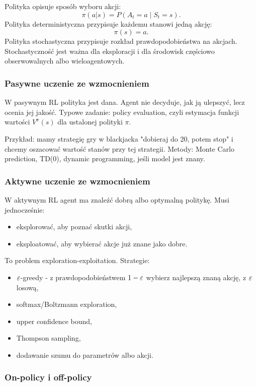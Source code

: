 Polityka opisuje sposób wyboru akcji:
\[
\pi(a|s)=P(A_t=a\mid S_t=s).
\]
Polityka deterministyczna przypisuje każdemu stanowi jedną akcję:
\[
\pi(s)=a.
\]
Polityka stochastyczna przypisuje rozkład prawdopodobieństwa na akcjach. Stochastyczność jest ważna dla eksploracji i dla środowisk częściowo obserwowalnych albo wieloagentowych.

\subsubsection{Pasywne uczenie ze wzmocnieniem}

W pasywnym RL polityka jest dana. Agent nie decyduje, jak ją ulepszyć, lecz ocenia jej jakość. Typowe zadanie: policy evaluation, czyli estymacja funkcji wartości $V^\pi(s)$ dla ustalonej polityki $\pi$.

Przykład: mamy strategię gry w blackjacka "dobieraj do 20, potem stop" i chcemy oszacować wartość stanów przy tej strategii. Metody: Monte Carlo prediction, TD(0), dynamic programming, jeśli model jest znany.

\subsubsection{Aktywne uczenie ze wzmocnieniem}

W aktywnym RL agent ma znaleźć dobrą albo optymalną politykę. Musi jednocześnie:
\begin{itemize}
  \item eksplorować, aby poznać skutki akcji,
  \item eksploatować, aby wybierać akcje już znane jako dobre.
\end{itemize}

To problem exploration-exploitation. Strategie:
\begin{itemize}
  \item $\varepsilon$-greedy - z prawdopodobieństwem $1-\varepsilon$ wybierz najlepszą znaną akcję, z $\varepsilon$ losową,
  \item softmax/Boltzmann exploration,
  \item upper confidence bound,
  \item Thompson sampling,
  \item dodawanie szumu do parametrów albo akcji.
\end{itemize}

\subsubsection{On-policy i off-policy}

